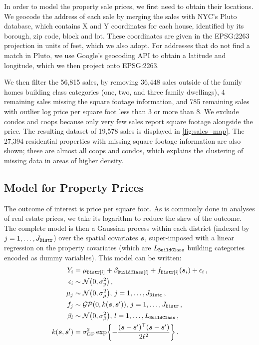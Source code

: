 \documentclass[12pt]{article}
\begin{document}
In order to model the property sale prices, we first need to obtain their locations.
We geocode the address of each sale by merging the sales with NYC's Pluto database, which contains X and Y coordinates for each house, identified by its borough, zip code, block and lot.
These coordinates are given in the EPSG:2263 projection in units of feet, which we also adopt.
For addresses that do not find a match in Pluto, we use Google's geocoding API to obtain a latitude and longitude, which we then project onto EPSG:2263.

We then filter the 56,815 sales, by removing
36,448 sales outside of the family homes building class categories (one, two, and three family dwellings),
4 remaining sales missing the square footage information,
and 785 remaining sales with outlier log price per square foot less than 3 or more than 8.
We exclude condos and coops because only very few sales report square footage alongside the price.
The resulting dataset of 19,578 sales is displayed in \autoref{fig:sales_map}.
The 27,394 residential properties with missing square footage information are also shown;
these are almost all coops and condos, which explains the clustering of missing data in areas of higher density.

\subsection{Model for Property Prices}
The outcome of interest is price per square foot.
As is commonly done in analyses of real estate prices, we take its logarithm to reduce the skew of the outcome.
The complete model is then a Gaussian process within each district (indexed by \(j=1,\dotsc,J_{\mathtt{Distr}}\)) over the spatial covariates \(\bm{s}\), super-imposed with a linear regression on the property covariates (which are \(L_{\mathtt{BuildClass}}\) building categories encoded as dummy variables).
This model can be written:
\begin{equation}
    \begin{split}
        Y_i &= %
        \mu_{\district\sbr{i}} + \beta_{\building\sbr{i}}
        + f_{\district\sbr{i}}(\svec_i) + \epsilon_i \,,
        \\
        \epsilon_i &\sim \normal\del{0, \sigma_y^2} \,, \\
        \mu_{j} &\sim \normal\del{0, \sigmamu^2},\,j=1,\dotsc,J_\district \,, \\
        f_j &\sim \GP\del{0, k(\svec, \svec')},\,j=1,\dotsc,J_\district \,, \\
        \beta_{l} &\sim \normal\del{0, \sigma_\beta^2},\,l=1,\dotsc,L_\building \,, \\
        k(\svec, \svec') &= \sigmaf^2 \exp\cbr{ - \frac{(\svec-\svec')\trans(\svec-\svec')}{2\ell^2}} \,.
    \end{split}
    \label{eq:nyc_model}
\end{equation}
\end{document}
